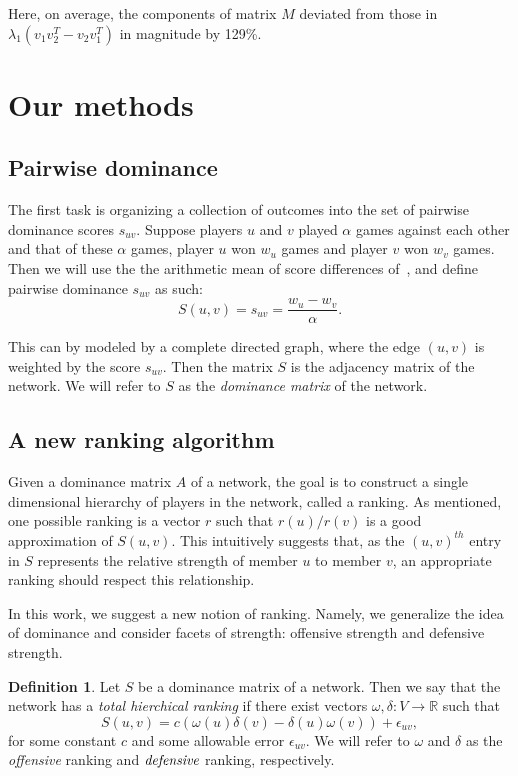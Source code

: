 \documentclass[a4,11pt,twoside,leqno]{report}
\theoremstyle{definition}
\newtheorem{defn}[thm]{Definition}
\theoremstyle{remark}
\numberwithin{equation}{section}
\newcommand{\R}{\mathbb{R}}
\begin{document}
 Here, on average, the components of matrix $M$ deviated from those in $\lambda_1(v_1v_2^T-v_2v_1^T)$ in magnitude by 129\%.
 
  
\section{Our methods}\label{sec:methods}

\subsection{Pairwise dominance}
The first task is organizing a collection of outcomes into the set of pairwise
dominance scores $s_{uv}$.  Suppose players $u$ and $v$  played $\alpha$ games
against each other and that of these $\alpha$ games, player $u$ won $w_u$ games
and player $v$ won $w_v$ games.  Then we will use the the arithmetic mean of
score differences of~\cite{jiang:statistical:mp10}, and define pairwise
dominance $s_{uv}$ as such:
\begin{equation}\label{eq:suv}
S(u,v) = s_{uv} = \frac{w_u - w_v}{\alpha}.
\end{equation}

This can by modeled by a complete directed graph, where the edge $(u,v)$ is
weighted by the score $s_{uv}$.  Then the matrix $S$ is the adjacency matrix of
the network.  We will refer to $S$ as the \emph{dominance matrix} of the
network.

\subsection{A new ranking algorithm}
Given a dominance matrix $A$ of a network, the goal is to construct a single
dimensional hierarchy of players in the network, called a ranking.  As
mentioned, one possible ranking is a vector $r$ such that $r(u)/r(v)$ is a good
approximation of $S(u,v)$.  This intuitively suggests that, as the $(u,v)^{th}$
entry in $S$ represents the relative strength of member $u$ to member $v$, an
appropriate ranking should respect this relationship.

In this work, we suggest a new notion of ranking.  Namely, we generalize the
idea of dominance and consider facets of strength: offensive strength and
defensive strength.

\begin{defn}
Let $S$ be a dominance matrix of a network.  Then we say that the network has a
\emph{total hierchical ranking} if there exist vectors $\omega, \delta: V
\rightarrow \R$ such that
\begin{equation}\label{eq:offdef}
S(u,v) = c(\omega(u)\delta(v) - \delta(u)\omega(v)) + \epsilon_{uv},
\end{equation}
for some constant $c$ and some allowable error $\epsilon_{uv}$.  We will refer
to $\omega$ and $\delta$ as the \emph{offensive} ranking and $\emph{defensive}$
ranking, respectively.
\end{defn}
\end{document}
